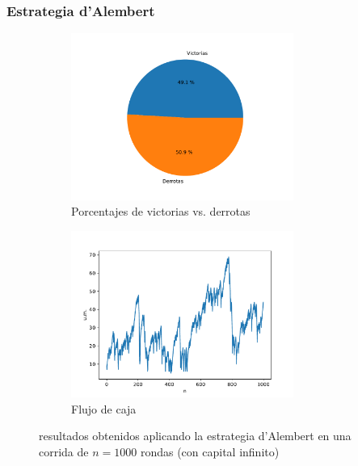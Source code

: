 \documentclass{article}
\begin{document}
  \subsubsection{Estrategia d’Alembert}
  \begin{figure}[H]
    \centering
    \begin{subfigure}{0.5\textwidth}
      \centering
      \includegraphics[width=0.8\textwidth]{generated/porcentajes-d'alembert-no acotado.pdf}
      \caption{Porcentajes de victorias vs. derrotas}
    \end{subfigure}%
    \begin{subfigure}{0.5\textwidth}
      \centering
      \includegraphics[width=0.8\textwidth]{generated/capital-d'alembert-no acotado.pdf}
      \caption{Flujo de caja}
    \end{subfigure}
    \caption{resultados obtenidos aplicando la estrategia d’Alembert en una corrida de $n = 1000$ rondas (con capital infinito)}
  \end{figure}
\end{document}
